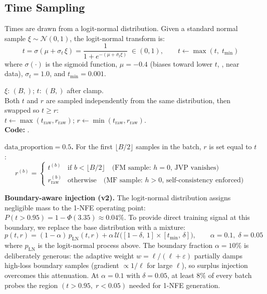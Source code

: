 \subsection{Time Sampling}
\label{sec:time_sampling}

Times are drawn from a logit-normal distribution.  Given a standard normal
sample $\xi \sim \mathcal{N}(0,1)$, the logit-normal transform is:
\begin{equation}
  t = \sigma(\mu + \sigma_t\,\xi)
    = \frac{1}{1 + e^{-(\mu + \sigma_t \xi)}}
    \;\in (0,1),
  \qquad
  t \leftarrow \max(t,\;t_{\min})
  \label{eq:time_sampling}
\end{equation}
where $\sigma(\cdot)$ is the sigmoid function, $\mu = -0.4$ (biases toward
lower $t$, \ie, near data), $\sigma_t = 1.0$, and $t_{\min} = 0.001$.
\begin{shapes}
$\xi$: $(B,)$; $t$: $(B,)$ after clamp.\\
Both $t$ and $r$ are sampled independently from the same distribution,
then swapped so $t \ge r$:\\
$t \leftarrow \max(t_\mathrm{raw}, r_\mathrm{raw})$;
$r \leftarrow \min(t_\mathrm{raw}, r_\mathrm{raw})$.\\
\textbf{Code:} .
\end{shapes}

\textbf{$\mathrm{data\_proportion} = 0.5$.}  For the first $\lfloor B/2
\rfloor$ samples in the batch, $r$ is set equal to $t$:
\begin{equation}
  r^{(b)} =
  \begin{cases}
    t^{(b)} & \text{if } b < \lfloor B/2 \rfloor
      \quad\text{(FM sample: }h = 0\text{, JVP vanishes)} \\
    r^{(b)}_{\mathrm{raw}} & \text{otherwise}
      \quad\text{(MF sample: }h > 0\text{, self-consistency enforced)}
  \end{cases}
  \label{eq:data_proportion}
\end{equation}

\textbf{Boundary-aware injection (v2).}  The logit-normal distribution
assigns negligible mass to the 1-NFE operating point: $P(t > 0.95) =
1 - \Phi(3.35) \approx 0.04\%$.  To provide direct training signal at this
boundary, we replace the base distribution with a mixture:
\begin{equation}
  p(t,r) = (1-\alpha)\,p_{\mathrm{LN}}(t,r)
         + \alpha\,\mathcal{U}\!\bigl([1{-}\delta,\,1] \times [t_{\min},\,\delta]\bigr),
  \qquad \alpha = 0.1,\;\delta = 0.05
  \label{eq:boundary_sampling}
\end{equation}
where $p_{\mathrm{LN}}$ is the logit-normal process above.  The boundary
fraction $\alpha = 10\%$ is deliberately generous: the adaptive weight
$w = \ell/(\ell + \varepsilon)$ partially damps high-loss boundary samples
(gradient $\propto 1/\ell$ for large $\ell$), so surplus injection overcomes
this attenuation.  At $\alpha = 0.1$ with $\delta = 0.05$, at least $8\%$ of
every batch probes the region $(t > 0.95,\;r < 0.05)$ needed for 1-NFE
generation.
